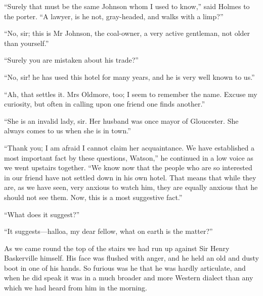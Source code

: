 \documentclass[paper=5.5in:8.5in,BCOR=7mm,twoside,DIV=calc,12pt,usegeometry,openany,chapterprefix,endperiod]{scrbook} %
\begin{document}
\enquote{Surely that must be the same Johnson whom I used to know,} said Holmes to the porter. \enquote{A lawyer, is he not, gray-headed, and walks with a limp?}

\enquote{No, sir; this is Mr Johnson, the coal-owner, a very active gentleman, not older than yourself.}

\enquote{Surely you are mistaken about his trade?}

\enquote{No, sir! he has used this hotel for many years, and he is very well known to us.}

\enquote{Ah, that settles it. Mrs Oldmore, too; I seem to remember the name. Excuse my curiosity, but often in calling upon one friend one finds another.}

\enquote{She is an invalid lady, sir. Her husband was once mayor of Gloucester. She always comes to us when she is in town.}

\enquote{Thank you; I am afraid I cannot claim her acquaintance. We have established a most important fact by these questions, Watson,} he continued in a low voice as we went upstairs together. \enquote{We know now that the people who are so interested in our friend have not settled down in his own hotel. That means that while they are, as we have seen, very anxious to watch him, they are equally anxious that he should not see them. Now, this is a most suggestive fact.}

\enquote{What does it suggest?}

\enquote{It suggests\nobreakdash---halloa, my dear fellow, what on earth is the matter?}

As we came round the top of the stairs we had run up against Sir Henry Baskerville himself. His face was flushed with anger, and he held an old and dusty boot in one of his hands. So furious was he that he was hardly articulate, and when he did speak it was in a much broader and more Western dialect than any which we had heard from him in the morning.
\end{document}
